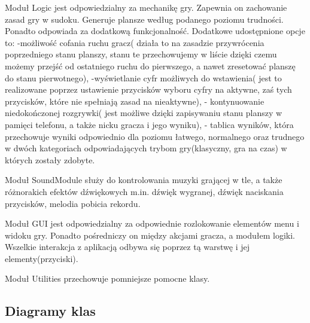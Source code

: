 \documentclass[a4paper, 11pt]{article}
\begin{document}
Moduł Logic jest odpowiedzialny za mechanikę gry. Zapewnia on zachowanie zasad gry w sudoku. Generuje plansze według podanego poziomu trudności. Ponadto odpowiada za dodatkową funkcjonalność. Dodatkowe udostępnione opcje to: 
-możliwość cofania ruchu gracz( działa to na zasadzie przywrócenia poprzedniego stanu planszy, stanu te przechowujemy w liście dzięki czemu możemy przejść od ostatniego ruchu do pierwszego, a nawet zresetować planszę do stanu pierwotnego), 
-wyświetlanie cyfr możliwych do wstawienia( jest to realizowane poprzez ustawienie przycisków wyboru cyfry na aktywne, zaś tych przycisków, które nie spełniają zasad na nieaktywne),
- kontynuowanie niedokończonej rozgrywki( jest możliwe dzięki zapisywaniu stanu planszy w pamięci telefonu, a także nicku gracza i jego wyniku),
- tablica wyników, która przechowuje wyniki odpowiednio dla poziomu łatwego, normalnego oraz trudnego w dwóch kategoriach odpowiadających trybom gry(klasyczny, gra na czas) w których zostały zdobyte. 


Moduł SoundModule służy do kontrolowania muzyki grającej w tle, a także różnorakich efektów dźwiękowych m.in. dźwięk wygranej, dźwięk naciskania przycisków, melodia pobicia rekordu.


Moduł GUI jest odpowiedzialny za odpowiednie rozlokowanie elementów menu i widoku gry. Ponadto pośredniczy on między akcjami gracza, a modułem logiki. Wszelkie interakcja z aplikacją odbywa się poprzez tą warstwę i jej elementy(przyciski).


Moduł Utilities przechowuje pomniejsze pomocne klasy.

\subsection{Diagramy klas}
\end{document}

